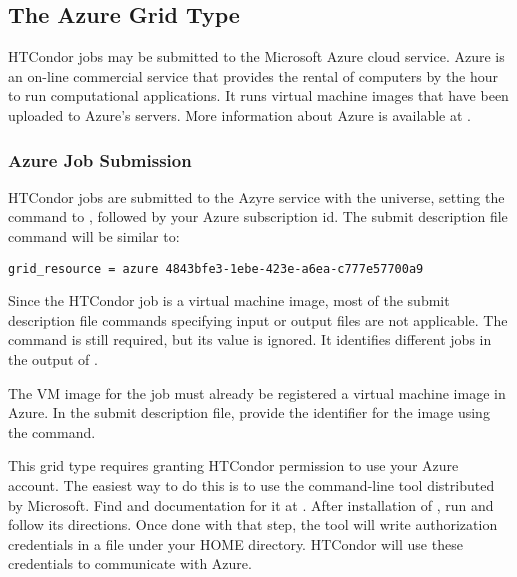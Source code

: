 \subsection{\label{sec:Azure}The Azure Grid Type }

HTCondor jobs may be submitted to the Microsoft Azure
cloud service.
Azure is an on-line commercial service that provides
the rental of computers by the hour to run computational applications.
It runs virtual machine images that have been uploaded to Azure's
servers.
More information about Azure is available at
.

\subsubsection{\label{sec:Azure-submit}Azure Job Submission}

HTCondor jobs are submitted to the Azyre service
with the  universe, setting the
 command to , followed
by your Azure subscription id.
The submit description file command will be similar to:
\begin{verbatim}
grid_resource = azure 4843bfe3-1ebe-423e-a6ea-c777e57700a9
\end{verbatim}

Since the HTCondor job is a virtual machine image,
most of the submit description file commands
specifying input or output files are not applicable.
The  command is still required,
but its value is ignored.
It identifies different jobs in the output of .

The VM image for the job must already be registered a virtual
machine image in Azure.
In the submit description file,
provide the identifier for the image using
the  command.

This grid type requires granting HTCondor permission to use your
Azure account.
The easiest way to do this is to use the 
command-line tool distributed by Microsoft.
Find  and documentation for it at
.
After installation of ,
run  and follow its directions.
Once done with that step,
the tool will write authorization credentials in a file
under your HOME directory.
HTCondor will use these credentials to communicate with Azure.

